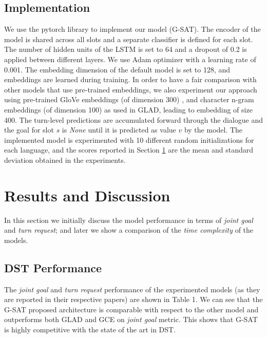 \documentclass{article}
\begin{document}
\subsection{Implementation}
We use the pytorch \cite{Paszke2017AutomaticDI} library to implement our model (G-SAT).
The encoder of the model is shared across all slots and a separate classifier is defined for each slot.
The number of hidden units of the LSTM is set to 64 and a dropout of 0.2 is applied between different layers.
We use Adam optimizer with a learning rate of 0.001.
The embedding dimension of the default model is set to 128, and embeddings are learned during training.
In order to have a fair comparison with other models that use pre-trained embeddings, we also experiment our approach using pre-trained GloVe embeddings (of dimension 300) \cite{glove}, and character n-gram embeddings (of dimension 100) \cite{hashimoto} as used in GLAD, leading to embedding of size 400.
The turn-level predictions are accumulated forward through the dialogue and the goal for slot $s$ is \textit{None} until it is predicted as value $v$ by the model.
The implemented model is experimented with 10 different random initializations for each language, and the scores reported in Section \ref{sec:results} are the mean and standard deviation obtained in the experiments.

\section{Results and Discussion}
\label{sec:results}
In this section we initially discuss  the model performance in terms of \textit{joint goal} and \textit{turn request}; and later we show a comparison of the \textit{time complexity} of the models.

\subsection{DST Performance}
The \textit{joint goal} and \textit{turn request} performance of the experimented models (as they are reported in their respective papers) are shown in Table 1. We can see that the G-SAT proposed architecture is comparable with respect to  the other model and outperforms both GLAD and GCE on \textit{joint goal} metric. This shows that G-SAT is highly competitive with the state of the art in DST.
\end{document}
